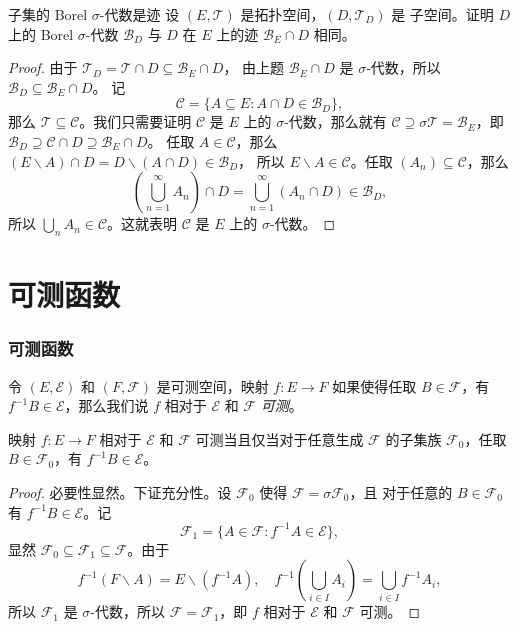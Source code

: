 \documentclass[fontset=none]{Notes}
\begin{document}
\begin{exercise}{子集的 Borel $\sigma$-代数是迹}{}
  设 $(E,\mathcal{T})$ 是拓扑空间，$(D,\mathcal{T}_D)$ 是
  子空间。证明 $D$ 上的 Borel $\sigma$-代数 $\mathcal{B}_D$
  与 $D$ 在 $E$ 上的迹 $\mathcal{B}_E\cap D$ 相同。
\end{exercise}
\begin{proof}
  由于 $\mathcal{T}_D=\mathcal{T}\cap D\subseteq \mathcal{B}_E\cap D$，
  由上题 $\mathcal{B}_E\cap D$ 是 $\sigma$-代数，所以 $\mathcal{B}_D\subseteq\mathcal{B}_E\cap D$。
  记
  \[
    \mathcal{C}=\{A\subseteq E: A\cap D\in \mathcal{B}_D\},  
  \]
  那么 $\mathcal{T}\subseteq \mathcal{C}$。我们只需要证明 $\mathcal{C}$
  是 $E$ 上的 $\sigma$-代数，那么就有 $\mathcal{C}\supseteq \sigma \mathcal{T}=\mathcal{B}_E$，即
  $\mathcal{B}_D\supseteq \mathcal{C}\cap D\supseteq \mathcal{B}_E\cap D$。
  任取 $A\in \mathcal{C}$，那么 $(E \smallsetminus A)\cap D=D \smallsetminus (A\cap D)\in \mathcal{B}_D$，
  所以 $E \smallsetminus A\in \mathcal{C}$。任取 $(A_n)\subseteq \mathcal{C}$，那么
  \[
    \left(\bigcup_{n=1}^\infty A_n\right)\cap D=\bigcup_{n=1}^\infty (A_n\cap D)
    \in \mathcal{B}_D,  
  \]
  所以 $\bigcup_n A_n\in \mathcal{C}$。这就表明 $\mathcal{C}$
  是 $E$ 上的 $\sigma$-代数。
\end{proof}


\section{可测函数}

\subsubsection{可测函数}

令 $(E,\mathcal{E})$ 和 $(F,\mathcal{F})$ 是可测空间，映射 $f:E\to F$ 如果使得任取 $B\in \mathcal{F}$，有
$f^{-1}B\in \mathcal{E}$，那么我们说 $f$ 相对于 $\mathcal{E}$ 和 $\mathcal{F}$ \emph{可测}。

\begin{proposition}\label{prop:equivalent condition of measurable}
  映射 $f:E\to F$ 相对于 $\mathcal{E}$ 和 $\mathcal{F}$ 可测当且仅当对于任意生成 $\mathcal{F}$ 的子集族
  $\mathcal{F}_0$，任取 $B\in \mathcal{F}_0$，有 $f^{-1}B\in \mathcal{E}$。
\end{proposition}
\begin{proof}
  必要性显然。下证充分性。设 $\mathcal{F}_0$ 使得 $\mathcal{F}=\sigma \mathcal{F}_0$，且
  对于任意的 $B\in \mathcal{F}_0$ 有 $f^{-1}B\in \mathcal{E}$。记
  \[
    \mathcal{F}_1=\{A\in \mathcal{F}: f^{-1}A\in \mathcal{E}\},
  \]
  显然 $\mathcal{F}_0\subseteq \mathcal{F}_1\subseteq \mathcal{F}$。由于
  \[
    f^{-1}\left(F \smallsetminus A\right)=E \smallsetminus(f^{-1}A),\quad
    f^{-1}\left(\bigcup_{i\in I}A_i\right)=\bigcup_{i\in I} f^{-1}A_i,
  \]
  所以 $\mathcal{F}_1$ 是 $\sigma$-代数，所以 $\mathcal{F}=\mathcal{F}_1$，即 $f$ 
  相对于 $\mathcal{E}$ 和 $\mathcal{F}$ 可测。
\end{proof}
\end{document}

